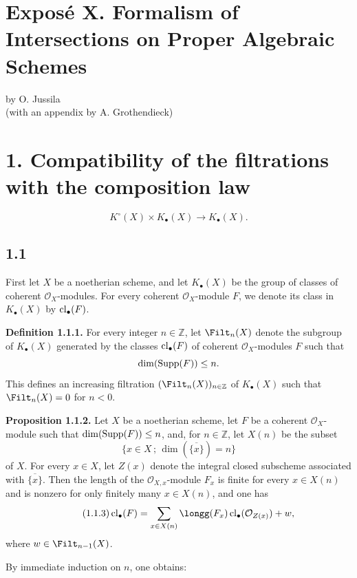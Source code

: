 
\section*{Expos\'e X. Formalism of Intersections on Proper Algebraic Schemes}
\begin{center}
by O. Jussila\\
(with an appendix by A. Grothendieck)
\end{center}

\section*{1. Compatibility of the filtrations with the composition law}
\[
K^\circ(X)\times K_\bullet(X)\longrightarrow K_\bullet(X).
\]

\subsection*{1.1}
First let $X$ be a noetherian scheme, and let $K_\bullet(X)$ be the group of
classes of coherent $\mathcal O_X$-modules. For every coherent
$\mathcal O_X$-module $F$, we denote its class in $K_\bullet(X)$ by
$\operatorname{cl}_\bullet(F)$.

\textbf{Definition 1.1.1.}
For every integer $n\in\mathbb Z$, let $\Filt_n(X)$ denote the subgroup of
$K_\bullet(X)$ generated by the classes $\operatorname{cl}_\bullet(F)$ of coherent
$\mathcal O_X$-modules $F$ such that
\[
\dim(\operatorname{Supp}(F))\leq n.
\]
This defines an increasing filtration $(\Filt_n(X))_{n\in\mathbb Z}$ of
$K_\bullet(X)$ such that $\Filt_n(X)=0$ for $n<0$.

\textbf{Proposition 1.1.2.}
Let $X$ be a noetherian scheme, let $F$ be a coherent $\mathcal O_X$-module
such that $\dim(\operatorname{Supp}(F))\leq n$, and, for $n\in\mathbb Z$, let $X(n)$ be the
subset
\[
\{x\in X\,;\,\dim(\overline{\{x\}})=n\}
\]
of $X$. For every $x\in X$, let $Z(x)$ denote the integral closed subscheme
associated with $\overline{\{x\}}$. Then the length of the
$\mathcal O_{X,x}$-module $F_x$ is finite for every $x\in X(n)$ and is
nonzero for only finitely many $x\in X(n)$, and one has
\begin{equation}\tag{1.1.3}
\cl_\bullet(F)=
\sum_{x\in X(n)}\longg(F_x)\cl_\bullet(\mathcal O_{Z(x)})+w,
\end{equation}
where $w\in\Filt_{n-1}(X)$.

By immediate induction on $n$, one obtains:

